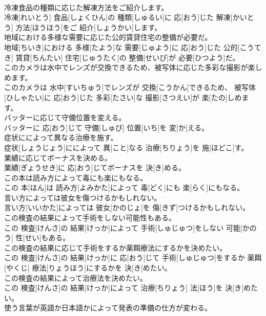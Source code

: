 \documentclass[8pt]{extreport}
\begin{document}
\begin{CJK}{UTF8}{min}
\\	冷凍食品の種類に応じた解凍方法をご紹介します。	
\\	冷凍[れいとう] 食品[しょくひん]の 種類[しゅるい]に 応[おう]じた 解凍[かいとう] 方法[ほうほう]をご 紹介[しょうかい]します。
\\	地域における多様な需要に応じた公的賃貸住宅の整備が必要だ。	
\\	地域[ちいき]における 多様[たよう]な 需要[じゅよう]に 応[おう]じた 公的[こうてき] 賃貸[ちんたい] 住宅[じゅうたく]の 整備[せいび]が 必要[ひつよう]だ。
\\	このカメラは水中でレンズが交換できるため、被写体に応じた多彩な撮影が楽しめます。	
\\	このカメラは 水中[すいちゅう]でレンズが 交換[こうかん]できるため、 被写体[ひしゃたい]に 応[おう]じた 多彩[たさい]な 撮影[さつえい]が 楽[たの]しめます。
\\	バッターに応じて守備位置を変える。	
\\	バッターに 応[おう]じて 守備[しゅび] 位置[いち]を 変[か]える。
\\	症状にによって異なる治療を施す。	
\\	症状[しょうじょう]にによって 異[こと]なる 治療[ちりょう]を 施[ほどこ]す。
\\	業績に応じてボーナスを決める。	
\\	業績[ぎょうせき]に 応[おう]じてボーナスを 決[き]める。
\\	この本は読み方によって毒にも楽にもなる。	
\\	この 本[ほん]は 読み方[よみかた]によって 毒[どく]にも 楽[らく]にもなる。
\\	言い方によっては彼女を傷つけるかもしれない。	
\\	言い方[いいかた]によっては 彼女[かのじょ]を 傷[きず]つけるかもしれない。
\\	この検査の結果によって手術をしない可能性もある。	
\\	この 検査[けんさ]の 結果[けっか]によって 手術[しゅじゅつ]をしない 可能[かのう] 性[せい]もある。
\\	この検査の結果に応じて手術をするか薬餌療法にするかを決めたい。	
\\	この 検査[けんさ]の 結果[けっか]に 応[おう]じて 手術[しゅじゅつ]をするか 薬餌[やくじ] 療法[りょうほう]にするかを 決[き]めたい。
\\	この検査の結果によって治療法を決めたい。	
\\	この 検査[けんさ]の 結果[けっか]によって 治療[ちりょう] 法[ほう]を 決[き]めたい。
\\	使う言葉が英語か日本語かによって発表の準備の仕方が変わる。	

\end{CJK}
\end{document}
